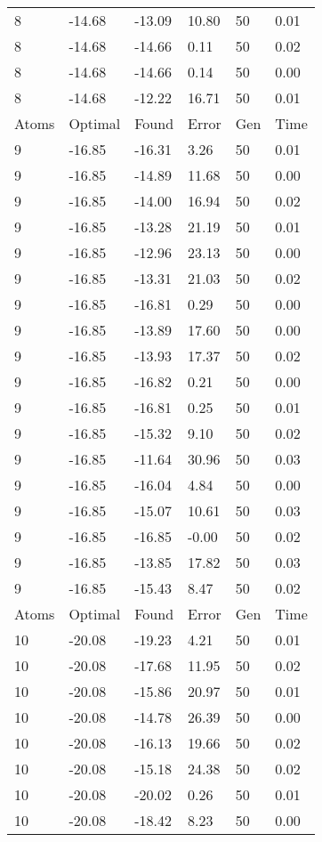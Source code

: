 \documentclass{report}
\begin{document}
\begin{appendix}
\begin{longtable}{llllll}
8 & -14.68 & -13.09 & 10.80 & 50 & 0.01 \\
8 & -14.68 & -14.66 & 0.11 & 50 & 0.02 \\
8 & -14.68 & -14.66 & 0.14 & 50 & 0.00 \\
8 & -14.68 & -12.22 & 16.71 & 50 & 0.01 \\
Atoms & Optimal & Found & Error & Gen & Time \\
9 & -16.85 & -16.31 & 3.26 & 50 & 0.01 \\
9 & -16.85 & -14.89 & 11.68 & 50 & 0.00 \\
9 & -16.85 & -14.00 & 16.94 & 50 & 0.02 \\
9 & -16.85 & -13.28 & 21.19 & 50 & 0.01 \\
9 & -16.85 & -12.96 & 23.13 & 50 & 0.00 \\
9 & -16.85 & -13.31 & 21.03 & 50 & 0.02 \\
9 & -16.85 & -16.81 & 0.29 & 50 & 0.00 \\
9 & -16.85 & -13.89 & 17.60 & 50 & 0.00 \\
9 & -16.85 & -13.93 & 17.37 & 50 & 0.02 \\
9 & -16.85 & -16.82 & 0.21 & 50 & 0.00 \\
9 & -16.85 & -16.81 & 0.25 & 50 & 0.01 \\
9 & -16.85 & -15.32 & 9.10 & 50 & 0.02 \\
9 & -16.85 & -11.64 & 30.96 & 50 & 0.03 \\
9 & -16.85 & -16.04 & 4.84 & 50 & 0.00 \\
9 & -16.85 & -15.07 & 10.61 & 50 & 0.03 \\
9 & -16.85 & -16.85 & -0.00 & 50 & 0.02 \\
9 & -16.85 & -13.85 & 17.82 & 50 & 0.03 \\
9 & -16.85 & -15.43 & 8.47 & 50 & 0.02 \\
Atoms & Optimal & Found & Error & Gen & Time \\
10 & -20.08 & -19.23 & 4.21 & 50 & 0.01 \\
10 & -20.08 & -17.68 & 11.95 & 50 & 0.02 \\
10 & -20.08 & -15.86 & 20.97 & 50 & 0.01 \\
10 & -20.08 & -14.78 & 26.39 & 50 & 0.00 \\
10 & -20.08 & -16.13 & 19.66 & 50 & 0.02 \\
10 & -20.08 & -15.18 & 24.38 & 50 & 0.02 \\
10 & -20.08 & -20.02 & 0.26 & 50 & 0.01 \\
10 & -20.08 & -18.42 & 8.23 & 50 & 0.00 \\

\end{longtable}
\end{appendix}
\end{document}
